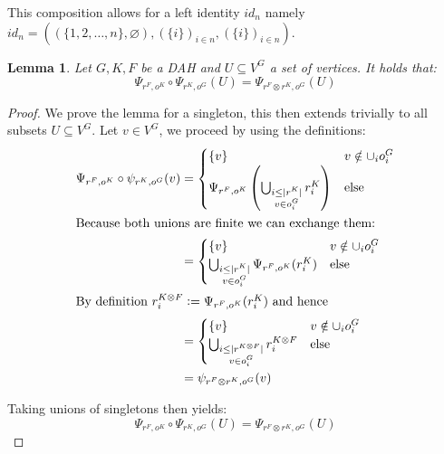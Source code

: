 \documentclass[12pt]{article}
\newtheorem{lemma}[theorem]{Lemma}
\theoremstyle{definition}
\newcommand{\defeq}{\vcentcolon=}
\newcommand{\1}{\mathbbm{1}}
\begin{document}
This composition allows for a left identity $id_n$ namely $id_n = ((\{1,2,\dots,n\}, \varnothing), (\{i\})_{i\in n}, (\{i\})_{i\in n})$.\vspace{5pt}

\begin{lemma}\label{lem:psieq}
    Let $G,K,F$ be a DAH and $U\subseteq V^G$ a set of vertices. It holds that:
    \[
        \Psi_{r^F, o^K}\circ \Psi_{r^K, o^G}(U) = \Psi_{r^F\otimes r^K, o^G}(U)
    \]
\end{lemma}

\begin{proof}
    We prove the lemma for a singleton, this then extends trivially to all subsets $U\subseteq V^G$. Let $v\in V^G$, we proceed by using the definitions:
    \begin{align*}
        \Psi_{r^F, o^K}\circ \psi_{r^K, o^G}(v) &= 
        \begin{cases}
            \{v\} & v\notin \cup_i o_i^G\\
            \Psi_{r^F, o^K}\left(\bigcup_{\substack{i \leq |r^K| \\ v \in o^G_i}} r^K_i\right) & \text{else}
        \end{cases}\\
        \intertext{Because both unions are finite we can exchange them: }
        &= 
        \begin{cases}
            \{v\} & v\notin \cup_i o_i^G\\
            \bigcup_{\substack{i \leq |r^K| \\ v \in o^G_i}} \Psi_{r^F, o^K} (r^K_i) & \text{else}\\
        \end{cases}\\
        \intertext{By definition $r^{K\otimes F}_i \defeq \Psi_{r^F, o^K} (r^K_i)$ and hence}
        &=
        \begin{cases}
            \{v\} & v\notin \cup_i o_i^G\\
            \bigcup_{\substack{i\leq  |r^{K\otimes F}| \\ v \in o^G_i}} r^{K\otimes F}_i & \text{else}\\
        \end{cases}\\
        &= \psi_{r^F\otimes r^K, o^G}(v)
    \end{align*}

    Taking unions of singletons then yields:
    \[
        \Psi_{r^F, o^K}\circ \Psi_{r^K, o^G}(U) = \Psi_{r^F\otimes r^K, o^G}(U)
    \]
\end{proof}
\end{document}
